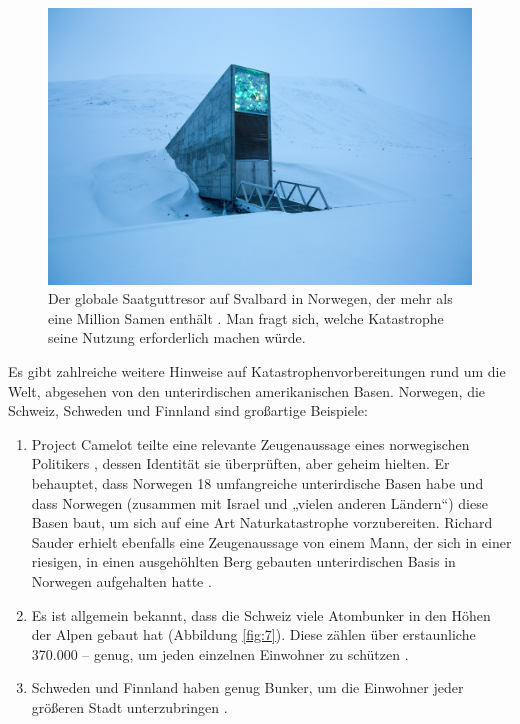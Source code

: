 \documentclass[10pt,twocolumn,letterpaper]{article}
\begin{document}
\begin{figure}[t]
\begin{center}
   \includegraphics[width=1\linewidth]{svalbard.jpg}
\end{center}
   \caption{Der globale Saatguttresor auf Svalbard in Norwegen, der mehr als eine Million Samen enthält \cite{24}. Man fragt sich, welche Katastrophe seine Nutzung erforderlich machen würde.}
\label{fig:8}
\label{fig:onecol}
\end{figure}

Es gibt zahlreiche weitere Hinweise auf Katastrophenvorbereitungen rund um die Welt, abgesehen von den unterirdischen amerikanischen Basen. Norwegen, die Schweiz, Schweden und Finnland sind großartige Beispiele:
\begin{flushleft}
\begin{enumerate}
    \item Project Camelot teilte eine relevante Zeugenaussage eines norwegischen Politikers \cite{25,26}, dessen Identität sie überprüften, aber geheim hielten. Er behauptet, dass Norwegen 18 umfangreiche unterirdische Basen habe und dass Norwegen (zusammen mit Israel und „vielen anderen Ländern“) diese Basen baut, um sich auf eine Art Naturkatastrophe vorzubereiten. Richard Sauder erhielt ebenfalls eine Zeugenaussage von einem Mann, der sich in einer riesigen, in einen ausgehöhlten Berg gebauten unterirdischen Basis in Norwegen aufgehalten hatte \cite{22}.
    \item Es ist allgemein bekannt, dass die Schweiz viele Atombunker in den Höhen der Alpen gebaut hat (Abbildung \ref{fig:7}). Diese zählen über erstaunliche 370.000 – genug, um jeden einzelnen Einwohner zu schützen \cite{27}.
    \item Schweden und Finnland haben genug Bunker, um die Einwohner jeder größeren Stadt unterzubringen \cite{27}.
\end{enumerate}
\end{flushleft}
\end{document}
